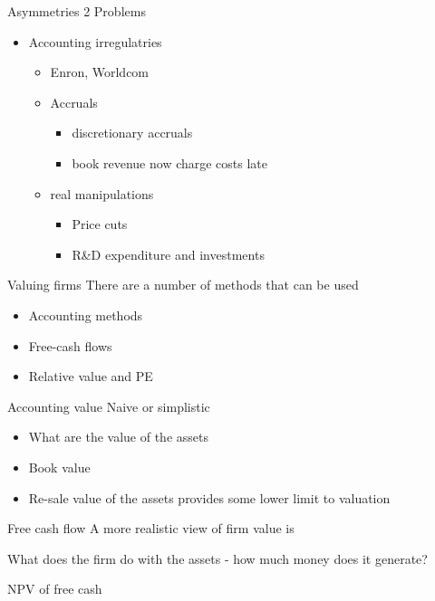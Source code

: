 \documentclass[14pt,xcolor=pdftex,dvipsnames,table]{beamer}\usepackage[]{graphicx}\usepackage[]{color}
\begin{document}
\begin{frame}{Asymmetries 2}
Problems
\pause
\begin{itemize}[<+-| alert@+>]
\item Accounting irregulatries
\begin{itemize}
\item Enron, Worldcom 
\item Accruals
\begin{itemize}
\item discretionary accruals
\item book revenue now charge costs late
\end{itemize}
\item real manipulations
\begin{itemize}
\item Price cuts
\item R\&D expenditure and investments
\end{itemize}
\end{itemize}
\end{itemize}
\end{frame}

\begin{frame}{Valuing firms}
There are a number of methods that can be used
\begin{itemize}[<+-| alert@+>]
\pause
\item Accounting methods
\item Free-cash flows
\item Relative value and PE
\end{itemize}
\end{frame}

\begin{frame}{Accounting value}
Naive or simplistic
\begin{itemize}[<+-| alert@+>]
\pause
\item What are the value of the assets 
\item Book value
\item Re-sale value of the assets provides some lower limit to valuation
\end{itemize}
\end{frame}

\begin{frame}{Free cash flow}
A more realistic view of firm value is 
\pause
\begin{block}{}
What does the firm do with the assets - how much money does it generate?
\end{block}
\pause
NPV of free cash
\end{frame}
\end{document}
